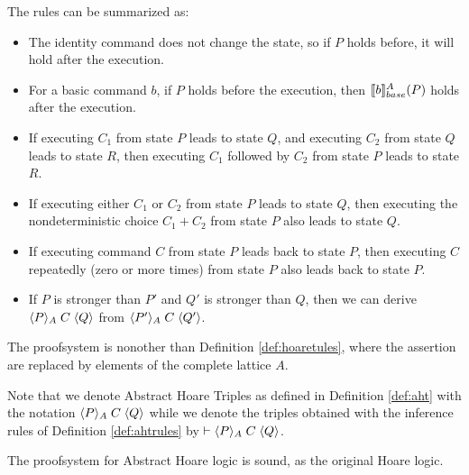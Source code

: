 \documentclass[
  10pt,       %
  twoside,    %
  a4paper,    %
  english,    %
  tikz,       %
  openright,  %
]{book}
\begin{document}
The rules can be summarized as:
\begin{itemize}
  \item The identity command does not change the state, so if $P$ holds before,
    it will hold after the execution.

  \item For a basic command $b$, if $P$ holds before the execution, then 
    $\llbracket b \rrbracket_{base}^A(P)$ holds after the execution.

  \item If executing $C_1$ from state $P$ leads to state $Q$, and executing
    $C_2$ from state $Q$ leads to state $R$, then executing $C_1$ followed by
    $C_2$ from state $P$ leads to state $R$.

  \item If executing either $C_1$ or $C_2$ from state $P$ leads to state $Q$,
    then executing the nondeterministic choice $C_1 + C_2$ from state $P$ also
    leads to state $Q$.

  \item If executing command $C$ from state $P$ leads back to state $P$, then
    executing $C$ repeatedly (zero or more times) from state $P$ also leads
    back to state $P$.

  \item If $P$ is stronger than $P'$ and $Q'$ is stronger than $Q$, then we can
    derive $\langle P \rangle_{A} \; C \; \langle Q \rangle$ from $\langle P' \rangle_{A} \; C \; \langle Q' \rangle$.
\end{itemize}

The proofsystem is nonother than Definition \ref{def:hoaretules},
where the assertion are replaced by elements of the complete lattice $A$.

Note that we denote Abstract Hoare Triples as defined in Definition \ref{def:aht}
with the notation $\langle P \rangle_{A} \; C \; \langle Q \rangle$ while we denote the triples obtained
with the inference rules of Definition \ref{def:ahtrules} by $\vdash 
\langle P \rangle_{A} \; C \; \langle Q \rangle$.

The proofsystem for Abstract Hoare logic is sound, as the original Hoare logic.
\end{document}
